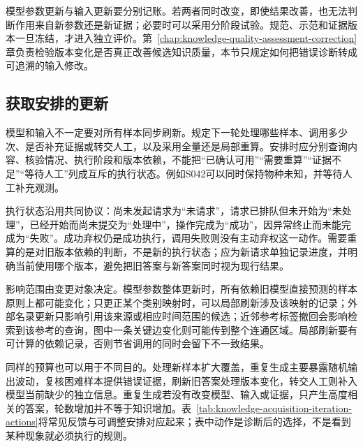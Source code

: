 模型参数更新与输入更新要分别记账。若两者同时改变，即使结果改善，也无法判断作用来自新参数还是新证据；必要时可以采用分阶段试验。规范、示范和证据版本一旦冻结，才进入独立评价。第~\ref{chap:knowledge-quality-assessment-correction}章负责检验版本变化是否真正改善候选知识质量，本节只规定如何把错误诊断转成可追溯的输入修改。

\subsection{获取安排的更新}
\label{sec:knowledge-acquisition-schedule-update}

模型和输入不一定要对所有样本同步刷新。规定下一轮处理哪些样本、调用多少次、是否补充证据或转交人工，以及采用全量还是局部重算。安排时应分别查询内容、核验情况、执行阶段和版本依赖，不能把“已确认可用”“需要重算”“证据不足”“等待人工”列成互斥的执行状态。例如S042可以同时保持物种未知，并等待人工补充观测。

执行状态沿用共同协议：尚未发起请求为“未请求”，请求已排队但未开始为“未处理”，已经开始而尚未提交为“处理中”，操作完成为“成功”，因异常终止而未能完成为“失败”。成功弃权仍是成功执行，调用失败则没有主动弃权这一动作。需要重算的是对旧版本依赖的判断，不是新的执行状态；应为新请求单独记录进度，并明确当前使用哪个版本，避免把旧答案与新答案同时视为现行结果。

影响范围由变更对象决定。模型参数整体更新时，所有依赖旧模型直接预测的样本原则上都可能变化；只更正某个类别映射时，可以局部刷新涉及该映射的记录；外部名录更新只影响引用该来源或相应时间范围的候选；近邻参考标签撤回会影响检索到该参考的查询，图中一条关键边变化则可能传到整个连通区域。局部刷新要有可计算的依赖记录，否则节省调用的同时会留下不一致结果。

同样的预算也可以用于不同目的。处理新样本扩大覆盖，重复生成主要暴露随机输出波动，复核困难样本提供错误证据，刷新旧答案处理版本变化，转交人工则补入模型当前缺少的独立信息。重复生成若没有改变模型、输入或证据，只产生高度相关的答案，轮数增加并不等于知识增加。表~\ref{tab:knowledge-acquisition-iteration-actions}将常见反馈与可调整安排对应起来；表中动作是诊断后的选择，不是看到某种现象就必须执行的规则。

